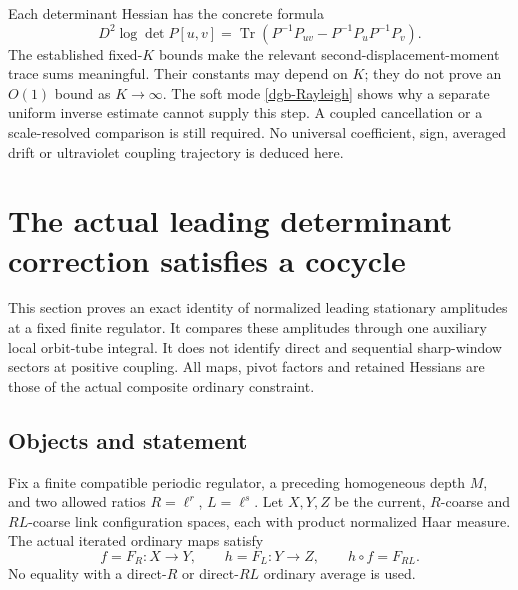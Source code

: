 \documentclass[11pt]{article}
\theoremstyle{remark}
\begin{document}
Each determinant Hessian has the concrete formula
\begin{equation}
 D^2\log\det P[u,v]
   =\operatorname{Tr}\left(
       P^{-1}P_{uv}-P^{-1}P_uP^{-1}P_v\right).
 \label{dgb-trace-interface}
\end{equation}
The established fixed-$K$ bounds make the relevant
second-displacement-moment trace sums meaningful. Their
constants may depend on $K$; they do not prove an $O(1)$
bound as $K\to\infty$.
The soft mode \eqref{dgb-Rayleigh} shows why a separate
uniform inverse estimate cannot supply this step.
A coupled cancellation or a scale-resolved comparison
is still required. No universal coefficient, sign,
averaged drift or ultraviolet coupling trajectory is
deduced here.


\section{The actual leading determinant correction satisfies a cocycle}
\label{olc-section}

This section proves an exact identity of normalized leading stationary
amplitudes at a fixed finite regulator. It compares these amplitudes
through one auxiliary local orbit-tube integral. It does not identify
direct and sequential sharp-window sectors at positive coupling.
All maps, pivot factors and retained Hessians are those of the
actual composite ordinary constraint.

\subsection{Objects and statement}
\label{olc-setup-section}

Fix a finite compatible periodic regulator, a preceding homogeneous
depth $M$, and two allowed ratios $R=\ell^r$, $L=\ell^s$.
Let $X,Y,Z$ be the current, $R$-coarse and $RL$-coarse link
configuration spaces, each with product normalized Haar measure.
The actual iterated ordinary maps satisfy
\begin{equation}
 f=F_R:X\longrightarrow Y,\qquad
 h=F_L:Y\longrightarrow Z,\qquad
 h\circ f=F_{RL}.
 \label{olc-maps}
\end{equation}
No equality with a direct-$R$ or direct-$RL$ ordinary average
is used.
\end{document}

